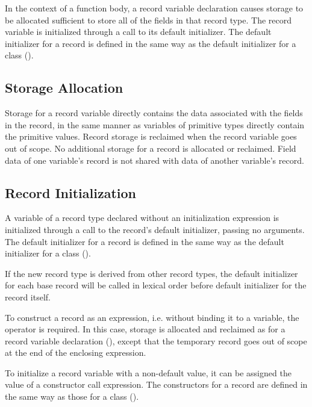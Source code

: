 In the context of a function body, a record variable declaration
causes storage to be allocated sufficient to store all of the fields in that
record type.  The record variable is initialized through a call to its
default initializer.  The default initializer for a record is defined in the
same way as the default initializer for a class ().

\subsection{Storage Allocation}
\label{Record_Storage}

Storage for a record variable directly contains the data associated
with the fields in the record, in the same manner as variables
of primitive types directly contain the primitive values.
Record storage is reclaimed when the record variable goes out of scope.
No additional storage for a record is allocated or reclaimed.
Field data of one variable's record is not shared with data
of another variable's record.

\subsection{Record Initialization}
\label{Record_Initialization}

A variable of a record type declared without an initialization expression
is initialized through a call to the record's default initializer, passing no arguments.
The default initializer for a record is defined in the same way as the default
initializer for a class ().

If the new record type is derived from other record types, the
default initializer for each base record will be called in lexical order before default
initializer for the record itself.

To construct a record as an expression,
i.e. without binding it to a variable, the  operator is
required.  In this case, storage is allocated and reclaimed as for a record
variable declaration (), except that the temporary record
goes out of scope at the end of the enclosing expression.

To initialize a record variable with a non-default value, it can be assigned
the value of a constructor call expression.  The constructors for a record are
defined in the same way as those for a class ().

